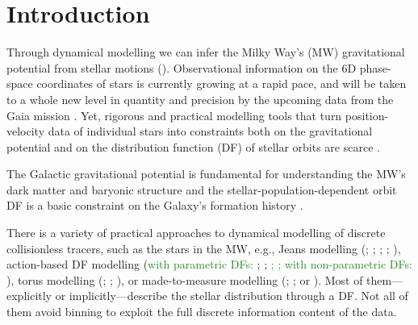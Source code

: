 \documentclass[iop,revtex4,numberedappendix,appendixfloats]{emulateapj}
\newcommand{\NEW}[1]{\textcolor{ForestGreen}{#1}}
\begin{document}

\section{Introduction} \label{sec:intro}

Through dynamical modelling we can infer the Milky Way's (MW) gravitational potential from stellar motions (\citealt{2008gady.book.....B,2011Prama..77...39B,2013A&ARv..21...61R}). Observational information on the 6D phase-space coordinates of stars is currently growing at a rapid pace, and will be taken to a whole new level in quantity and precision by the upcoming data from the Gaia mission \citep{2001A&A...369..339P}. Yet, rigorous and practical modelling tools that turn position-velocity data of individual stars into constraints both on the gravitational potential and on the distribution function (DF) of stellar orbits are scarce \citep{2013A&ARv..21...61R}.

The Galactic gravitational potential is fundamental for understanding the MW's dark matter and baryonic structure \citep{2012EPJWC..1910002M,2013A&ARv..21...61R,2013PhR...531....1S,2014JPhG...41f3101R} and the stellar-population-dependent orbit DF is a basic constraint on the Galaxy's formation history \citep{2013NewAR..57...29B,2015MNRAS.449.3479S}.

There is a variety of practical approaches to dynamical modelling of discrete collisionless tracers, such as the stars in the MW, e.g., Jeans modelling (\citealt{1989MNRAS.239..605K}; \citealt{2012ApJ...756...89B}; \citealt{2012MNRAS.425.1445G}; \citealt{2013ApJ...772..108Z}; \citealt{2015MNRAS.452..956B}), action-based DF modelling (\NEW{with parametric DFs:} \citealt{2013ApJ...779..115B}; \citealt{2014MNRAS.445.3133P}; \citealt{2015MNRAS.449.3479S}\NEW{; \citealt{2016arXiv160309332D}; with non-parametric DFs: \citealt{2014MNRAS.437.2230M}}), torus modelling (\citealt{2008MNRAS.390..429M}; \citealt{2012MNRAS.419.2251M}; \citealt{2013MNRAS.433.1411M}), or made-to-measure modelling (\citealt{1996MNRAS.282..223S}; \citealt{2007MNRAS.376...71D}; or \citealt{2014MNRAS.443.2112H}). Most of them---explicitly or implicitly---describe the stellar distribution through a DF. Not all of them avoid binning to exploit the full discrete information content of the data.
\end{document}
